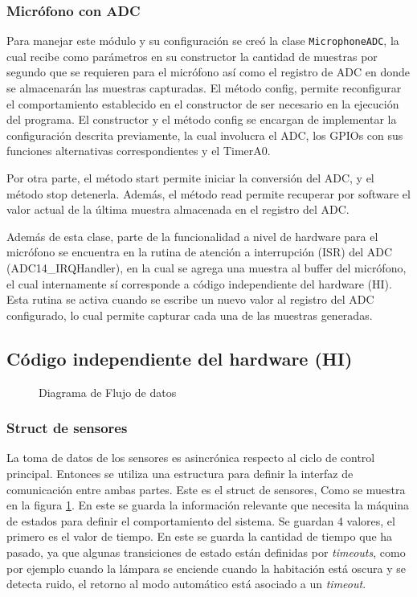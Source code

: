 \subsubsection{Micrófono con ADC}
Para manejar este módulo y su configuración se creó la clase \texttt{MicrophoneADC}, la cual recibe
como parámetros en su constructor la cantidad de muestras por segundo que se requieren para el
micrófono así como el registro de ADC en donde se almacenarán las muestras capturadas. El método
config, permite reconfigurar el comportamiento establecido en el constructor de ser necesario en la
ejecución del programa. El constructor y el método config se encargan de implementar la
configuración descrita previamente, la cual involucra el ADC, los GPIOs con sus funciones
alternativas correspondientes y el TimerA0.

Por otra parte, el método start permite iniciar la conversión del ADC, y el método stop
detenerla. Además, el método read permite recuperar por software el valor actual de la última
muestra almacenada en el registro del ADC.

Además de esta clase, parte de la funcionalidad a nivel de hardware para el micrófono se encuentra
en la rutina de atención a interrupción (ISR) del ADC (ADC14\_IRQHandler), en la cual se agrega una
muestra al buffer del micrófono, el cual internamente sí corresponde a código independiente del
hardware (HI). Esta rutina se activa cuando se escribe un nuevo valor al registro del ADC
configurado, lo cual permite capturar cada una de las muestras generadas.

\subsection{Código independiente del hardware (HI)}

\begin{figure}
\centering
\scalebox{.5}{}
\caption{Diagrama de Flujo de datos}
\label{fig:data_flow}
\end{figure}


\subsubsection{Struct de sensores}
La toma de datos de los sensores es asincrónica respecto al ciclo de control principal. Entonces se
utiliza una estructura para definir la interfaz de comunicación entre ambas partes. Este es el
struct de sensores, Como se muestra en la figura \ref{fig:data_flow}. En este se guarda la
información relevante que necesita la máquina de estados para definir el comportamiento del
sistema. Se guardan 4 valores, el primero es el valor de tiempo. En este se guarda la cantidad de
tiempo que ha pasado, ya que algunas transiciones de estado están definidas por \textit{timeouts},
como por ejemplo cuando la lámpara se enciende cuando la habitación está oscura y se detecta ruido,
el retorno al modo automático está asociado a un \textit{timeout}.

